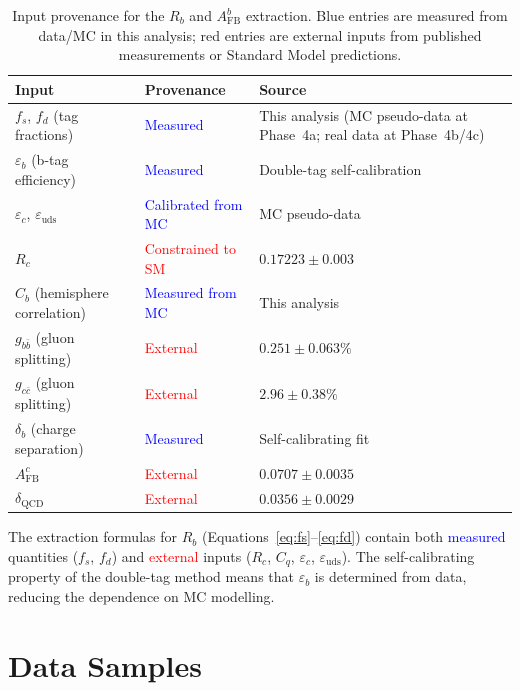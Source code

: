 \documentclass[11pt,a4paper]{article}
\newcommand{\measured}[1]{\textcolor{blue}{#1}}
\newcommand{\external}[1]{\textcolor{red}{#1}}
\begin{document}
\begin{table}[htbp]
\centering
\caption{Input provenance for the $R_b$ and $A_\mathrm{FB}^b$ extraction.
Blue entries are measured from data/MC in this analysis; red entries are
external inputs from published measurements or Standard Model predictions.}
\label{tab:input_provenance}
\small
\begin{tabular}{lll}
\toprule
Input & Provenance & Source \\
\midrule
$f_s$, $f_d$ (tag fractions) & \measured{Measured} & This analysis (MC pseudo-data at Phase~4a; real data at Phase~4b/4c) \\
$\varepsilon_b$ (b-tag efficiency) & \measured{Measured} & Double-tag self-calibration \\
$\varepsilon_c$, $\varepsilon_\mathrm{uds}$ & \measured{Calibrated from MC} & MC pseudo-data \\
$R_c$ & \external{Constrained to SM} & $0.17223 \pm 0.003$~\cite{LEP:EWWG:2005} \\
$C_b$ (hemisphere correlation) & \measured{Measured from MC} & This analysis \\
$g_{b\bar{b}}$ (gluon splitting) & \external{External} & $0.251 \pm 0.063\%$~\cite{LEP:HF:2001} \\
$g_{c\bar{c}}$ (gluon splitting) & \external{External} & $2.96 \pm 0.38\%$~\cite{LEP:gcc} \\
$\delta_b$ (charge separation) & \measured{Measured} & Self-calibrating fit \\
$A_\mathrm{FB}^c$ & \external{External} & $0.0707 \pm 0.0035$~\cite{LEP:EWWG:2005} \\
$\delta_\mathrm{QCD}$ & \external{External} & $0.0356 \pm 0.0029$~\cite{LEP:EWWG:2005} \\
\bottomrule
\end{tabular}
\end{table}

The extraction formulas for $R_b$ (Equations~\ref{eq:fs}--\ref{eq:fd}) contain both
\measured{measured} quantities ($f_s$, $f_d$) and \external{external} inputs
($R_c$, $C_q$, $\varepsilon_c$, $\varepsilon_\mathrm{uds}$). The self-calibrating
property of the double-tag method means that $\varepsilon_b$ is determined from data,
reducing the dependence on MC modelling.

\FloatBarrier
{}
\section{Data Samples}
\label{sec:data}
\end{document}
